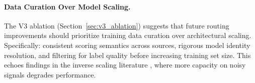 \paragraph{Data Curation Over Model Scaling.} The V3 ablation (Section~\ref{sec:v3_ablation}) suggests that future routing improvements should prioritize training data curation over architectural scaling. Specifically: consistent scoring semantics across sources, rigorous model identity resolution, and filtering for label quality before increasing training set size. This echoes findings in the inverse scaling literature \citep{mckenzie2023inverse}, where more capacity on noisy signals degrades performance.
